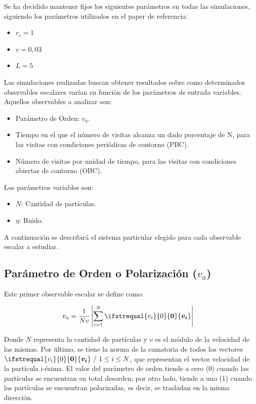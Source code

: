 \documentclass[11pt, a4paper]{article}
\renewcommand\vec[1]{\ifstrequal{#1}{0}{\ensuremath{\mathbf{0}}}{\ensuremath{\boldsymbol{#1}}}}
\begin{document}
        Se ha decidido mantener fijos los siguientes parámetros en todas las simulaciones, siguiendo los parámetros utilizados en el paper de referencia:
        \begin{itemize}
            \item $r_c = 1$
            \item $v = 0,03$
            \item $L = 5$
        \end{itemize}

        Las simulaciones realizadas buscan obtener resultados sobre como determinados observables escalares varían
        en función de los parámetros de entrada variables.
        Aquellos observables a analizar son:
        \begin{itemize}
            \item Parámetro de Orden: $v_a$.
            \item Tiempo en el que el número de visitas alcanza un dado porcentaje de N, para las visitas con condiciones periódicas de contorno (PBC).
            \item Número de visitas por unidad de tiempo, para las visitas con condiciones abiertas de contorno (OBC).
        \end{itemize}

        Los parámetros variables son:

        \begin{itemize}
            \item $N$: Cantidad de partículas.
            \item $\eta$: Ruido.
        \end{itemize}

        A continuación se describirá el sistema particular elegido para cada observable escalar a estudiar.

        \subsection{Parámetro de Orden o Polarización ($v_a$)}
        \label{subsec:polarizacion}

            Este primer observable escalar se define como:

            \begin{equation}
                v_a = \frac{1}{Nv} \left|\sum_{i=1}^{N} \vec{v_i} \right|
            \end{equation}

            Donde $N$ representa la cantidad de partículas y $v$ es el módulo de la velocidad de las mismas.
            Por último, se tiene la norma de la sumatoria de todos los vectores $\vec{v_i} \ / \  1 \le i \le N$,
            que representan el vector velocidad de la partícula i-ésima.
            El valor del parámetro de orden tiende a cero (0) cuando las partículas se encuentran en total desorden;
            por otro lado, tiende a uno (1) cuando las partículas se encuentran polarizadas, es decir, se trasladan en la misma dirección.
\end{document}
